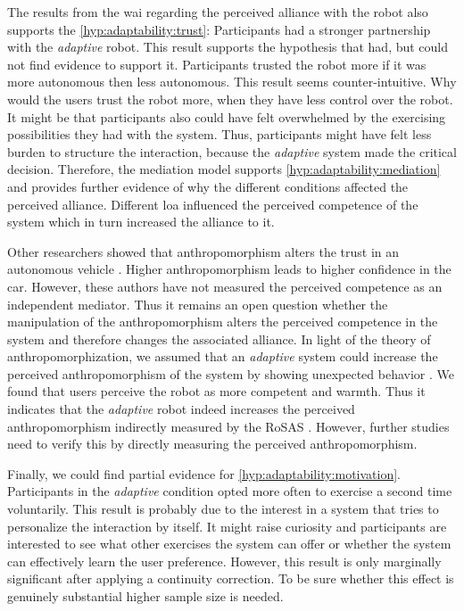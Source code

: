 \documentclass[twocolumn]{svjour3}          %
\begin{document}
The results from the \gls{wai} regarding the perceived alliance with the robot
also supports the \ref{hyp:adaptability:trust}: Participants had a
stronger partnership with the \textit{adaptive} robot. This result supports the
hypothesis that \autocite{rau2013effects} had, but could not find
evidence to support it. Participants trusted the robot more if it was
more autonomous then less autonomous. This result seems
counter-intuitive. Why would the users trust the robot more, when they
have less control over the robot. It might be that participants also
could have felt overwhelmed by the exercising possibilities they had
with the system. Thus, participants might have felt less burden to
structure the interaction, because the \textit{adaptive} system made the critical
decision. Therefore, the mediation model supports
\ref{hyp:adaptability:mediation} and provides further evidence of why
the different conditions affected the perceived alliance. Different \gls{loa}
influenced the perceived competence of the system which in turn
increased the alliance to it.

Other researchers showed that anthropomorphism alters the trust in an
autonomous vehicle \autocite{waytz2014mind}. Higher anthropomorphism
leads to higher confidence in the car. However, these authors have not
measured the perceived competence as an independent mediator. Thus it
remains an open question whether the manipulation of the
anthropomorphism alters the perceived competence in the system and
therefore changes the associated alliance. In light of the theory of
anthropomorphization, we assumed that an \textit{adaptive} system could increase
the perceived anthropomorphism of the system by showing unexpected
behavior \autocite{epley2007seeing}. We found that users perceive the
robot as more competent and warmth. Thus it indicates that the \textit{adaptive}
robot indeed increases the perceived anthropomorphism indirectly
measured by the RoSAS \autocite{carpinella2017robotic}. However, further
studies need to verify this by directly measuring the perceived
anthropomorphism.

Finally, we could find partial evidence for
\ref{hyp:adaptability:motivation}. Participants in the \textit{adaptive}
condition opted more often to exercise a second time voluntarily. This
result is probably due to the interest in a system that tries to
personalize the interaction by itself. It might raise curiosity and
participants are interested to see what other exercises the system can
offer or whether the system can effectively learn the user preference.
However, this result is only marginally significant after applying a
continuity correction. To be sure whether this effect is genuinely
substantial higher sample size is needed.
\end{document}
